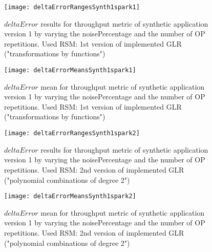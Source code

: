 \begin{figure}[h]

    \centering
    
    \texttt{[image: deltaErrorRangesSynth1spark1]}
    
     \caption{$deltaError$ results for throughput metric of synthetic application version 1 by varying the noisePercentage and the number of OP repetitions. Used RSM: 1st version of implemented GLR ("transformations by functions")}
    
    \label{fig::synth1spark1::intervals}
    
\end{figure}

\begin{figure}[h]

    \centering
    
    \texttt{[image: deltaErrorMeansSynth1spark1]}
    
    \caption{$deltaError$ mean for throughput metric of synthetic application version 1 by varying the noisePercentage and the number of OP repetitions. Used RSM: 1st version of implemented GLR ("transformations by functions")}
    
    \label{fig::synth1spark1::means}
    
\end{figure}





\begin{figure}[h]

    \centering
    
    \texttt{[image: deltaErrorRangesSynth1spark2]}
    
     \caption{$deltaError$ results for throughput metric of synthetic application version 1 by varying the noisePercentage and the number of OP repetitions. Used RSM: 2nd version of implemented GLR ("polynomial combinations of degree 2")}
    
    \label{fig::synth1spark2::intervals}
    
\end{figure}

\begin{figure}[h]

    \centering
    
    \texttt{[image: deltaErrorMeansSynth1spark2]}
    
    \caption{$deltaError$ mean for throughput metric of synthetic application version 1 by varying the noisePercentage and the number of OP repetitions. Used RSM: 2nd version of implemented GLR ("polynomial combinations of degree 2")}
    
    \label{fig::synth1spark2::means}
    
\end{figure}





